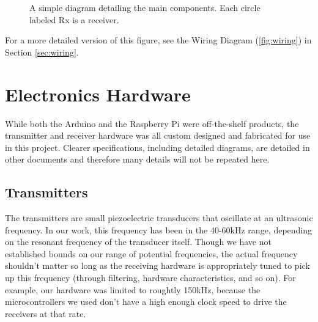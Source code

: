 \documentclass[12pt]{article}
\begin{document}
\begin{figure}[h]
\begin{center}
\end{center}
\caption{A simple diagram detailing the main components.
	Each circle labeled Rx is a receiver.}
\label{fig:component-diagram}
\end{figure}

For a more detailed version of this figure, see the
Wiring Diagram (\ref{fig:wiring}) in Section \ref{sec:wiring}.

\section{Electronics Hardware}\label{sec:ee-hardware}

While both the Arduino and the Raspberry Pi were off-the-shelf products,
the transmitter and receiver hardware was all custom designed and fabricated
for use in this project.
Clearer specifications, including detailed diagrams, are detailed in other
documents and therefore many details will not be repeated here.

\subsection{Transmitters}

The transmitters are small piezoelectric transducers that oscillate at an
ultrasonic frequency.
In our work, this frequency has been in the 40-60kHz range, depending on the
resonant frequency of the transducer itself.
Though we have not established bounds on our range of potential frequencies,
the actual frequency shouldn't matter so long as the receiving hardware is
appropriately tuned to pick up this frequency (through filtering,
hardware characteristics, and so on).
For example, our hardware was limited to roughtly 150kHz, because the
microcontrollers we used don't have a high enough clock speed to drive
the receivers at that rate.
\end{document}
